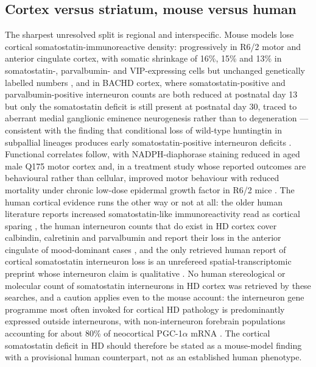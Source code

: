 \documentclass[11pt]{article}
\begin{document}
\subsection{Cortex versus striatum, mouse versus human}
\label{sec-06-cortex-striatum}

The sharpest unresolved split is regional and interspecific. Mouse models lose cortical somatostatin-immunoreactive density: progressively in R6/2 motor and anterior cingulate cortex, with somatic shrinkage of 16\%, 15\% and 13\% in somatostatin-, parvalbumin- and VIP-expressing cells but unchanged genetically labelled numbers \citep{Voelkl2022}, and in BACHD cortex, where somatostatin-positive and parvalbumin-positive interneuron counts are both reduced at postnatal day 13 but only the somatostatin deficit is still present at postnatal day 30, traced to aberrant medial ganglionic eminence neurogenesis rather than to degeneration \citep{Molero2026} --- consistent with the finding that conditional loss of wild-type huntingtin in subpallial lineages produces early somatostatin-positive interneuron deficits \citep{Mehler2019}. Functional correlates follow, with NADPH-diaphorase staining reduced in aged male Q175 motor cortex \citep{PadovanNeto2019} and, in a treatment study whose reported outcomes are behavioural rather than cellular, improved motor behaviour with reduced mortality under chronic low-dose epidermal growth factor in R6/2 mice \citep{Marottoli2019}. The human cortical evidence runs the other way or not at all: the older human literature reports increased somatostatin-like immunoreactivity read as cortical sparing \citep{Beal1988}, the human interneuron counts that do exist in HD cortex cover calbindin, calretinin and parvalbumin and report their loss in the anterior cingulate of mood-dominant cases \citep{Kim2014}, and the only retrieved human report of cortical somatostatin interneuron loss is an unrefereed spatial-transcriptomic preprint whose interneuron claim is qualitative \citep{VazquezSanchez2025}. No human stereological or molecular count of somatostatin interneurons in HD cortex was retrieved by these searches, and a caution applies even to the mouse account: the interneuron gene programme most often invoked for cortical HD pathology is predominantly expressed outside interneurons, with non-interneuron forebrain populations accounting for about 80\% of neocortical PGC-1$\alpha$ mRNA \citep{McMeekin2020}. The cortical somatostatin deficit in HD should therefore be stated as a mouse-model finding with a provisional human counterpart, not as an established human phenotype.
\end{document}

